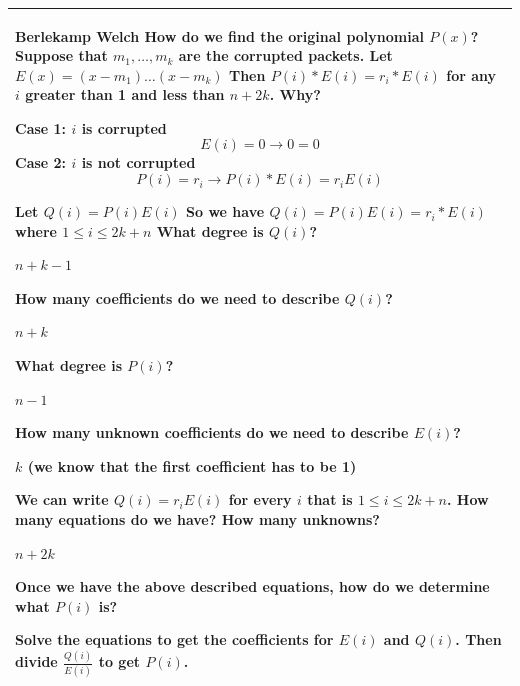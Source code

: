 \clearpage
{\tabulinesep=1mm
\begin{tabu}{|p{16cm} |}
\hline
\textbf{Berlekamp Welch} \newline
How do we find the original polynomial $P(x)$? \newline
Suppose that $m_1, \dotsc, m_k$ are the corrupted packets. Let $E(x) = (x - m_1) \dotsc (x - m_k)$
Then $P(i) * E(i) = r_i * E(i)$ for any $i$ greater than 1 and less than $n + 2k$. Why?
\begin{solution}[5 cm]
	Case 1: $i$ is corrupted
\[E(i) = 0 \rightarrow 0 = 0\]
			Case 2: $i$ is not corrupted
				\[P(i) = r_i \rightarrow P(i) * E(i) = r_i E(i)\]
\end{solution}

Let $Q(i) = P(i) E(i)$
So we have $Q(i)= P(i) E(i) = r_i * E(i)$ where $1 \leq i \leq 2k + n$
What degree is $Q(i)$? 
\begin{solution}[1 cm]
$n + k - 1$
\end{solution}

How many coefficients do we need to describe $Q(i)$? 
\begin{solution}[1 cm]
$n + k$
\end{solution}

What degree is $P(i)$? 
\begin{solution}[1 cm]
$n - 1$
\end{solution}

How many unknown coefficients do we need to describe $E(i)$? 
\begin{solution}[2 cm]
$k$ (we know that the first coefficient has to be 1)
\end{solution}

We can write $Q(i) = r_i E(i)$ for every $ i$ that is $1 \leq i \leq 2k + n$. \newline
How many equations do we have? How many unknowns? 
\begin{solution}[1 cm]
$n + 2k$
\end{solution}

Once we have the above described equations, how do we determine what 
$P(i)$ is?
\begin{solution}[3 cm]
Solve the equations to get the coefficients for $E(i)$ and $Q(i)$. 
Then divide $\frac{Q(i)}{E(i)}$ to get $P(i)$.
\end{solution}
\\
\hline
\end{tabu}
}
